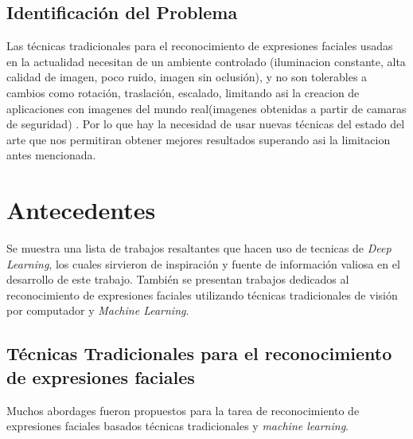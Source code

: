 \subsection{Identificación del Problema}
Las técnicas tradicionales para el reconocimiento de expresiones faciales usadas en la actualidad necesitan de un ambiente controlado (iluminacion constante, alta calidad de imagen, poco ruido, imagen sin oclusión), y no son tolerables a cambios como rotación, traslación, escalado, limitando asi la creacion de aplicaciones con imagenes del mundo real(imagenes obtenidas a partir de camaras de seguridad) . Por lo que hay la necesidad de usar nuevas técnicas del estado del arte que nos permitiran obtener mejores resultados superando asi la limitacion antes mencionada.

\section{Antecedentes}
Se muestra una lista de trabajos resaltantes que hacen uso de tecnicas de \textit{Deep Learning}, los cuales sirvieron de inspiración y fuente de información valiosa en el desarrollo de este trabajo. También se presentan trabajos dedicados al reconocimiento de expresiones faciales utilizando técnicas tradicionales de visión por computador y \textit{Machine Learning}.

\subsection{Técnicas Tradicionales para el reconocimiento de expresiones faciales}
Muchos abordages fueron propuestos para la tarea de reconocimiento de expresiones faciales basados técnicas tradicionales y \textit{machine learning}. 

